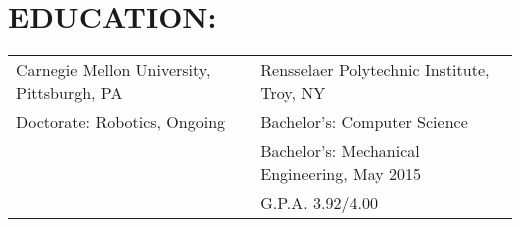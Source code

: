 \section{EDUCATION:}
\begin{tabular}{ll}
  Carnegie Mellon University, Pittsburgh, PA & Rensselaer Polytechnic Institute, Troy, NY \\
  Doctorate: Robotics, Ongoing & Bachelor's: Computer Science \\
                               &Bachelor's: Mechanical Engineering, May 2015 \\
                               &G.P.A. 3.92/4.00
\end{tabular}

